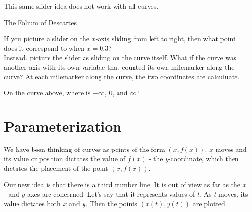 \documentclass{ximera}
\begin{document}
\begin{center}
\end{center}




This same slider idea does not work with all curves.





The Folium of Descartes





\begin{center}
\end{center}


If you picture a slider on the $x$-axis sliding from left to right, then what point does it correspond to when $x = 0.3$? \\


Instead, picture the slider as sliding on the curve itself. What if the curve was another axis with its own variable that counted its own milemarker along the curve? At each milemarker along the curve, the two coordinates are calculuate.





\begin{center}
\end{center}





On the curve above, where is $-\infty$, $0$, and $\infty$?







\section{Parameterization}




We have been thinking of curves as points of the form $(x, f(x))$. $x$ moves and its value or position dictates the value of $f(x)$ - the $y$-coordinate, which then dictates the placement of the point $(x, f(x))$.


Our new idea is that there is a third number line.  It is out of view as far as the $x$- and $y$-axes are concerned.  Let's say that it represents values of $t$.  As $t$ moves, its value dictates both $x$ and $y$. Then the points $(x(t), y(t))$ are plotted.
\end{document}
